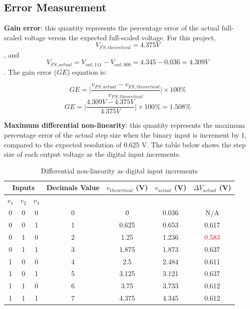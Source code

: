 \documentclass[12pt]{article}
\begin{document}
    \subsection{Error Measurement}

    \textbf{Gain error}: this quantity represents the percentage error of the actual full-scaled voltage versus the expected full-scaled voltage. For this project, \[V_{FS, theoretical}=4.375V\], and \[V_{FS, actual}=V_{out,111}-V_{out,000}=4.345-0.036=4.309V\]. The gain error (\(GE\)) equation is: 

    \[GE=\Big|\frac{v_{FS,actual}-v_{FS,theoretical}}{v_{FS,theoretical}}\Big| \times 100\%\]
    \[GE=\Big|\frac{4.309V-4.375V}{4.375V}\Big| \times 100\%=1.508\%\]


    \textbf{Maximum differential non-linearity}: this quantity represents the maximum percentage error of the actual step size when the binary input is increment by 1, compared to the expected resolution of 0.625 V. The table below shows the step size of each output voltage as the digital input increments. 

    \begin{table}[H]
        \centering
        \begin{tabular}{|c|c|c|c|c|c|c|}
            \hline
            \multicolumn{3}{|c|}{\textbf{Inputs}} & \textbf{Decimals Value} & \(v_{theoretical}\) (V) & \(v_{actual}\) (V) & \(\Delta V_{actual}\) (V) \\ \hline
            \(v_1\) & \(v_2\) & \(v_3\) &  & & &  \\ \hline
            0 & 0 & 0 & 0 & 0 & 0.036 & N/A \\ \hline
            0 & 0 & 1 & 1 & 0.625 & 0.653 & 0.617 \\ \hline
            0 & 1 & 0 & 2 & 1.25 & 1.236 & \textcolor{red}{0.583}\\ \hline
            0 & 1 & 1 & 3 & 1.875 & 1.873 & 0.637 \\ \hline
            1 & 0 & 0 & 4 & 2.5 & 2.484 & 0.611 \\ \hline
            1 & 0 & 1 & 5 & 3.125 & 3.121 & 0.637 \\ \hline
            1 & 1 & 0 & 6 & 3.75 & 3.733 & 0.612\\ \hline
            1 & 1 & 1 & 7 & 4.375 & 4.345 & 0.612 \\ \hline
        \end{tabular}
        \caption{Differential non-linearity as digital input increments}
    \end{table}
\end{document}

